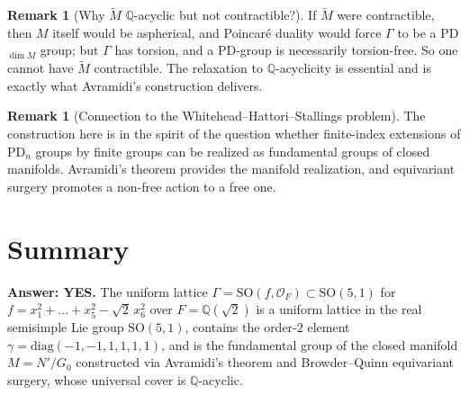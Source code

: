 \documentclass[12pt]{article}
\theoremstyle{definition}
\newtheorem{remark}[theorem]{Remark}
\begin{document}
\begin{remark}[Why $\widetilde{M}$ $\mathbb{Q}$-acyclic but not contractible?]
If $\widetilde{M}$ were contractible, then $M$ itself would be aspherical, and Poincar\'e duality would force $\Gamma$ to be a PD$_{\dim M}$ group; but $\Gamma$ has torsion, and a PD-group is necessarily torsion-free. So one cannot have $\widetilde{M}$ contractible. The relaxation to $\mathbb{Q}$-acyclicity is essential and is exactly what Avramidi's construction delivers.
\end{remark}

\begin{remark}[Connection to the Whitehead--Hattori--Stallings problem]
The construction here is in the spirit of the question whether finite-index extensions of PD$_n$ groups by finite groups can be realized as fundamental groups of closed manifolds. Avramidi's theorem provides the manifold realization, and equivariant surgery promotes a non-free action to a free one.
\end{remark}

\section*{Summary}

\textbf{Answer: YES.} The uniform lattice $\Gamma=\mathrm{SO}(f,\mathcal{O}_F)\subset\mathrm{SO}(5,1)$ for $f=x_1^2+\dots+x_5^2-\sqrt{2}\,x_6^2$ over $F=\mathbb{Q}(\sqrt{2})$ is a uniform lattice in the real semisimple Lie group $\mathrm{SO}(5,1)$, contains the order-$2$ element $\gamma=\mathrm{diag}(-1,-1,1,1,1,1)$, and is the fundamental group of the closed manifold $M=N'/G_0$ constructed via Avramidi's theorem and Browder--Quinn equivariant surgery, whose universal cover is $\mathbb{Q}$-acyclic.
\end{document}
